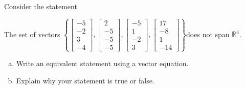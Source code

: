 
\begin{exerciseStatement}


Consider the statement 
\begin{center}\begin{minipage}{0.8\textwidth}
 The set of vectors \( \left\{ \left[\begin{array}{c}
-5 \\
-2 \\
3 \\
-4
\end{array}\right] , \left[\begin{array}{c}
2 \\
-5 \\
-5 \\
-5
\end{array}\right] , \left[\begin{array}{c}
-5 \\
1 \\
-2 \\
3
\end{array}\right] , \left[\begin{array}{c}
17 \\
-8 \\
1 \\
-14
\end{array}\right] \right\} \)does not span \(\mathbb{R}^4\). 
\end{minipage}\end{center}
    


\begin{enumerate}[(a)]
\item  Write an equivalent statement using a vector equation.
\item  Explain why your statement is true or false.
\end{enumerate}
    
\end{exerciseStatement}
    
